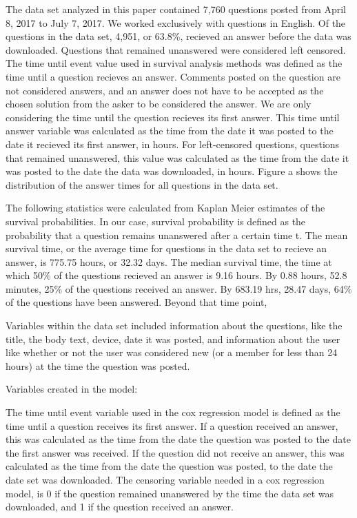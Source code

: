 \documentclass[12pt]{article}
\begin{document}
    The data set analyzed in this paper contained 7,760 questions posted from April 8, 2017 to July 7, 2017. We worked exclusively with questions in English. Of the questions in the data set, 4,951, or 63.8\%, recieved an answer before the data was downloaded. Questions that remained unanswered were considered left censored. The time until event value used in survival analysis methods was defined as the time until a question recieves an answer. Comments posted on the question are not considered answers, and an answer does not have to be accepted as the chosen solution from the asker to be considered the answer. We are only considering the time until the question recieves its first answer. This time until answer variable was calculated as the time from the date it was posted to the date it recieved its first answer, in hours. For left-censored questions, questions that remained unanswered, this value was calculated as the time from the date it was posted to the date the data was downloaded, in hours. Figure a shows the distribution of the answer times for all questions in the data set.  
    
    The following statistics were calculated from Kaplan Meier estimates of the survival probabilities. In our case, survival probability is defined as the probability that a question remains unanswered after a certain time t. The mean survival time, or the average time for questions in the data set to recieve an answer, is 775.75 hours, or 32.32 days. The median survival time, the time at which 50\% of the questions recieved an answer is 9.16 hours. By 0.88 hours, 52.8 minutes, 25\% of the questions received an answer. By 683.19 hrs, 28.47 days, 64\% of the questions have been answered. Beyond that time point, 
    
    
    Variables within the data set included information about the questions, like the title, the body text, device, date it was posted, and information about the user like whether or not the user was considered new (or a member for less than 24 hours) at the time the question was posted. 
    
    Variables created in the model: 

The time until event variable used in the cox regression model is defined as the time until a question receives its first answer. If a question received an answer, this was calculated as the time from the date the question was posted to the date the first answer was received. If the question did not receive an answer, this was calculated as the time from the date the question was posted, to the date the date set was downloaded. The censoring variable needed in a cox regression model, is 0 if the question remained unanswered by the time the data set was downloaded, and 1 if the question received an answer. 
\end{document}
